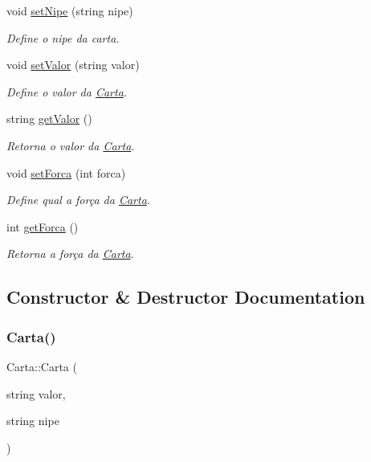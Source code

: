 \begin{DoxyCompactItemize}
void \mbox{\hyperlink{class_carta_a770fd5ddbf8d3378a0179420ced840e0}{set\+Nipe}} (string nipe)
\begin{DoxyCompactList}\small\item\em Define o nipe da carta. \end{DoxyCompactList}\item 
void \mbox{\hyperlink{class_carta_a66b728786354a62104ef2475b5376fea}{set\+Valor}} (string valor)
\begin{DoxyCompactList}\small\item\em Define o valor da \mbox{\hyperlink{class_carta}{Carta}}. \end{DoxyCompactList}\item 
string \mbox{\hyperlink{class_carta_a6d152881485bd02097ea3e18f63497ed}{get\+Valor}} ()
\begin{DoxyCompactList}\small\item\em Retorna o valor da \mbox{\hyperlink{class_carta}{Carta}}. \end{DoxyCompactList}\item 
void \mbox{\hyperlink{class_carta_a3702c22fee4f1b046eced67efb2ecb80}{set\+Forca}} (int forca)
\begin{DoxyCompactList}\small\item\em Define qual a força da \mbox{\hyperlink{class_carta}{Carta}}. \end{DoxyCompactList}\item 
int \mbox{\hyperlink{class_carta_ac36b784405c86a88ed91e4ee2fd43096}{get\+Forca}} ()
\begin{DoxyCompactList}\small\item\em Retorna a força da \mbox{\hyperlink{class_carta}{Carta}}. \end{DoxyCompactList}\end{DoxyCompactItemize}


\subsection{Constructor \& Destructor Documentation}
\mbox{\label{class_carta_ab40883af08945d0e13c94af2e74ab44e}} 
\subsubsection{\texorpdfstring{Carta()}{Carta()}\hspace{0.1cm}{\footnotesize\ttfamily [1/4]}}
{\footnotesize\ttfamily Carta\+::\+Carta (\begin{DoxyParamCaption}\item[{string}]{valor,  }\item[{string}]{nipe }\end{DoxyParamCaption})}



